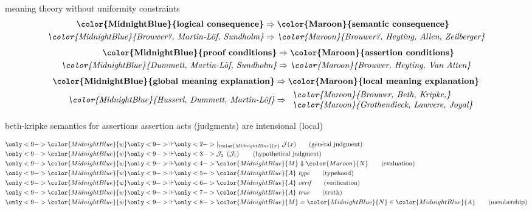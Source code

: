 \documentclass[10pt]{beamer}
\def\InputModeColorName{MidnightBlue}
\def\OutputModeColorName{Maroon}
\newcommand\IMode[1]{{\color{\InputModeColorName}{#1}}}
\newcommand\OMode[1]{{\color{\OutputModeColorName}{#1}}}
\newcommand\GenJ[2]{%
  \vert_{\IMode{#1}}\; #2
}
\newcommand\HypJ[2]{%
  #1\ \left(#2\right)
}
\newcommand\Eval[2]{\IMode{#1}\Downarrow\OMode{#2}}
\newcommand\EqMember[3]{\IMode{#1}=\IMode{#2}\in\IMode{#3}}
\newcommand\IsType[1]{\IMode{#1}\ \text{\rmfamily\itshape type}}
\newcommand\IsTrue[1]{\IMode{#1}\ \text{\rmfamily\itshape true}}
\newcommand\IsVer[1]{\IMode{#1}\ \text{\rmfamily\itshape verif}}
\begin{document}
\begin{frame}{meaning theory without uniformity constraints}
  \pause
  \begin{align*}
    \textbf{\IMode{logical consequence}} &\Rightarrow \textbf{\OMode{semantic consequence}}\\
    \textit{\IMode{Brouwer?, Martin-L\"of, Sundholm}} &\Rightarrow \textit{\OMode{Brouwer?, Heyting, Allen, Zeilberger}}
  \end{align*}
  \pause
  \begin{align*}
    \textbf{\IMode{proof conditions}} &\Rightarrow \textbf{\OMode{assertion conditions}}\\
    \textit{\IMode{Dummett, Martin-L\"of, Sundholm}} &\Rightarrow \textit{\OMode{Brouwer, Heyting, Van Atten}}
  \end{align*}
  \pause
  \begin{align*}
    \textbf{\IMode{global meaning explanation}} &\Rightarrow \textbf{\OMode{local meaning explanation}}\\
    \textit{\IMode{Husserl, Dummett, Martin-L\"of}} &\Rightarrow
      \begin{array}{l}
        \textit{\OMode{Brouwer, Beth, Kripke,}}\\
        \textit{\OMode{Grothendieck, Lawvere, Joyal}}
      \end{array}
  \end{align*}
\end{frame}

\begin{frame}{beth-kripke semantics for assertions}
  assertion acts (judgments) are intensional (local)
  \pause

  \begin{align*}
    \only<9->{\IMode{w}}&\only<9->{\Vdash}\only<2->{\GenJ{x}{\mathcal{J}(x)}\tag{general judgment}}\\
    \only<9->{\IMode{w}}&\only<9->{\Vdash}\only<3->{\HypJ{\mathcal{J}_2}{\mathcal{J}_1}\tag{hypothetical judgment}}\\
    \only<9->{\IMode{w}}&\only<9->{\Vdash}\only<4->{\Eval{M}{N}\tag{evaluation}}\\
    \only<9->{\IMode{w}}&\only<9->{\Vdash}\only<5->{\IsType{A}\tag{typehood}}\\
    \only<9->{\IMode{w}}&\only<9->{\Vdash}\only<6->{\IsVer{A}\tag{verification}}\\
    \only<9->{\IMode{w}}&\only<9->{\Vdash}\only<7->{\IsTrue{A}\tag{truth}}\\
    \only<9->{\IMode{w}}&\only<9->{\Vdash}\only<8->{\EqMember{M}{N}{A}\tag{membership}}
  \end{align*}
\end{frame}
\end{document}
